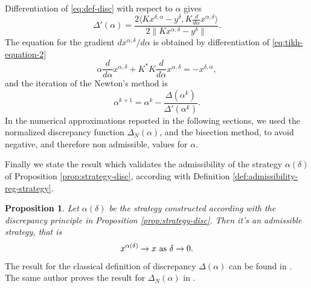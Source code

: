 \documentclass[10pt, a4paper, twoside, openright]{book}
\theoremstyle{definition}
\theoremstyle{plain}
\theoremstyle{plain}
\theoremstyle{plain}
\newtheorem{proposition}[subsection]{Proposition}
\theoremstyle{plain}
\theoremstyle{plain}
\theoremstyle{plain}
\theoremstyle{plain}
\theoremstyle{plain}
\begin{document}
Differentiation of \eqref{eq:def-disc} with respect to $\alpha$ gives
\begin{equation}
 \Delta'(\alpha) = \dfrac{2 \langle  Kx^{\delta, \alpha} - y^\delta, K\frac{d}{d\alpha}x^{\alpha, \delta}\rangle}{2\|Kx^{\alpha,\delta} - y^\delta\|}.
\end{equation}
The equation for the gradient $dx^{\alpha,\delta}/d\alpha$ is obtained by differentiation of \ref{eq:tikh-equation-2}
\begin{equation}
 \alpha\frac{d}{d\alpha}x^{\alpha, \delta} + K^*K\frac{d}{d\alpha}x^{\alpha, \delta} = -x^{\delta, \alpha},
\end{equation}
and the iteration of the Newton's method is
\begin{equation}
 \alpha^{k+1} = \alpha^k - \frac{\Delta(\alpha^k)}{\Delta'(\alpha^k)}.
\end{equation}
In the numerical approximations reported in the following sections, we used the normalized discrepancy function $\Delta_N(\alpha)$, and the bisection method, to avoid negative, and therefore non admissible, values for $\alpha$.
\par
Finally we state the result which validates the admissibility of 
the strategy $\alpha(\delta)$ of Proposition \ref{prop:strategy-disc}, according with Definition \ref{def:admissibility-reg-strategy}.
\begin{proposition}
 Let $\alpha(\delta)$ be the strategy constructed according with the discrepancy principle in Proposition \ref{prop:strategy-disc}. Then it's an admissible strategy, that is
 \begin{equation}
  x^{\alpha(\delta)}\to x \textup{ as }\delta\to0.
 \end{equation}
\end{proposition}
 The result for the classical definition of discrepancy $\Delta(\alpha)$ can be found in \cite{kirsch:book}. The same author proves the result for $\Delta_N(\alpha)$ in \cite{kirsch:shape-1998}.
\end{document}
